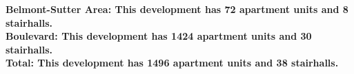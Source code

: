 \bf{Belmont-Sutter Area}: This development has 72 apartment units and 8 stairhalls.\\\bf{Boulevard}: This development has 1424 apartment units and 30 stairhalls.\\\bf{Total}: This development has 1496 apartment units and 38 stairhalls.\\